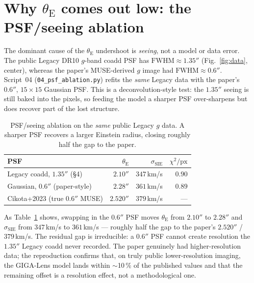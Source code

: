 \documentclass[11pt,letterpaper]{article}
\newcommand{\thetaE}{\ensuremath{\theta_{\mathrm{E}}}}
\newcommand{\sigmaSIE}{\ensuremath{\sigma_{\mathrm{SIE}}}}
\renewcommand{\arcsec}{\ensuremath{''}}
\begin{document}
\section{Why \texorpdfstring{$\thetaE$}{theta\_E} comes out low: the PSF/seeing ablation}
\label{sec:ablation}

The dominant cause of the $\thetaE$ undershoot is \emph{seeing}, not a
model or data error. The public Legacy DR10 $g$-band coadd PSF has
$\mathrm{FWHM}\approx1.35\arcsec$ (Fig.~\ref{fig:data}, center), whereas
the paper's MUSE-derived $g$ image had $\mathrm{FWHM}\approx0.6\arcsec$.
Script~04 (\texttt{04\_psf\_ablation.py}) refits the \emph{same} Legacy
data with the paper's $0.6\arcsec$, $15\times15$ Gaussian PSF. This is a
deconvolution-style test: the $1.35\arcsec$ seeing is still baked into
the pixels, so feeding the model a sharper PSF over-sharpens but does
recover part of the lost structure.

\begin{table}[ht]
\centering
\caption{PSF/seeing ablation on the \emph{same} public Legacy $g$ data.
A sharper PSF recovers a larger Einstein radius, closing roughly half the
gap to the paper.}
\label{tab:ablation}
\begin{tabular}{lrrr}
\toprule
PSF                                & $\thetaE$         & $\sigmaSIE$ & $\chi^2/\mathrm{px}$ \\
\midrule
Legacy coadd, $1.35\arcsec$ (\S4)  & $2.10\arcsec$     & $347\,$km/s & $0.90$ \\
Gaussian, $0.6\arcsec$ (paper-style) & $2.28\arcsec$   & $361\,$km/s & $0.89$ \\
\midrule
Cikota+2023 (true $0.6\arcsec$ MUSE) & $2.520\arcsec$  & $379\,$km/s & --- \\
\bottomrule
\end{tabular}
\end{table}

As Table~\ref{tab:ablation} shows, swapping in the $0.6\arcsec$ PSF moves
$\thetaE$ from $2.10\arcsec$ to $2.28\arcsec$ and $\sigmaSIE$ from
$347\,$km/s to $361\,$km/s --- roughly half the gap to the paper's
$2.520\arcsec$ / $379\,$km/s. The residual gap is irreducible: a
$0.6\arcsec$ PSF cannot create resolution the $1.35\arcsec$ Legacy coadd
never recorded. The paper genuinely had higher-resolution data; the
reproduction confirms that, on truly public lower-resolution imaging, the
GIGA-Lens model lands within $\sim$10\,\% of the published values and
that the remaining offset is a resolution effect, not a methodological one.
\end{document}
